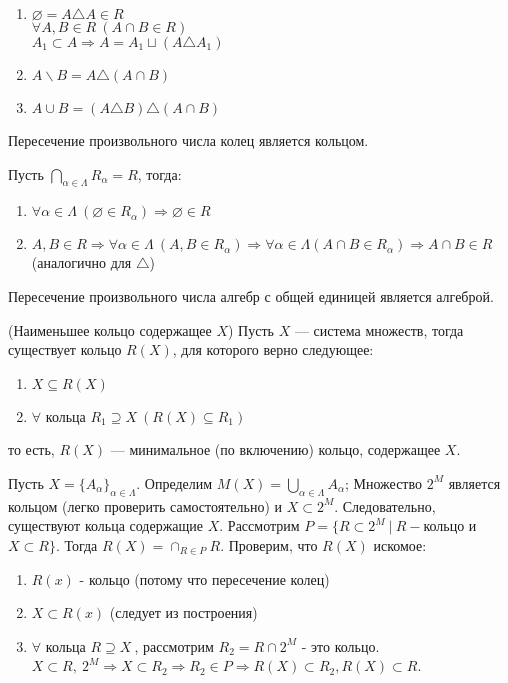 \Proof
\begin{enumerate} 
    \item $\varnothing = A \triangle A \in R$ \\
    $\forall A, B \in R\ (A \cap B \in R)$ \\
    $A_1 \subset A \Rightarrow A = A_1 \sqcup (A \triangle A_1)$
    \item $A \backslash B = A \triangle (A \cap B)$
    \item $A \cup B = (A \triangle B) \triangle (A \cap B)$ \EndProof
\end{enumerate} 

\Statement Пересечение произвольного числа колец является кольцом.

\Proof Пусть $\bigcap_{\alpha \in \Lambda} R_{\alpha} = R$, тогда:

\begin{enumerate} 
    \item $\forall \alpha \in \Lambda\ (\varnothing \in R_{\alpha}) \Rightarrow \varnothing \in R$
    \item $A, B \in R \Rightarrow \forall \alpha \in \Lambda \ (A, B \in R_{\alpha}) \Rightarrow \forall \alpha \in \Lambda (A \cap B \in R_{\alpha}) \Rightarrow A \cap B \in R$ (аналогично для $\triangle$) \EndProof
\end{enumerate} 

\Conseq Пересечение произвольного числа алгебр с общей единицей является алгеброй.

\Statement (Наименьшее кольцо содержащее $X$) Пусть $X$ — система множеств, тогда существует кольцо $R(X)$, для которого верно следующее:

\begin{enumerate} 
    \item $X \subseteq R(X)$
    \item $\forall$ кольца $R_1 \supseteq X\ (R(X) \subseteq R_1)$
\end{enumerate} 
 то есть, $R(X)$ — минимальное (по включению) кольцо, содержащее $X$.

\Proof Пусть $X = \{A_{\alpha}\}_{\alpha\in\Lambda}$. Определим $M(X) =\bigcup_{\alpha \in\Lambda} A_{\alpha}$; Множество $2^M$ является кольцом (легко проверить самостоятельно) и $X \subset 2^M$. Следовательно, существуют кольца содержащие $X$. Рассмотрим $P = \{R \subset 2^M\ |\ R - $кольцо и $ X \subset R\}$. Тогда $R(X) = \cap_{R \in P} R$. Проверим, что $R(X)$ искомое:
\begin{enumerate}
    \item $R(x)$ - кольцо (потому что пересечение колец)
    \item $X \subset R(x)$ (следует из построения)
    \item $\forall$ кольца $R \supseteq X\ $, рассмотрим $R_2 = R \cap 2^M$ - это кольцо. $X \subset R,\ 2^M \Rightarrow X \subset R_2 \Rightarrow R_2 \in P \Rightarrow R(X) \subset R_2, R(X) \subset R$.
\end{enumerate}
 \EndProof

